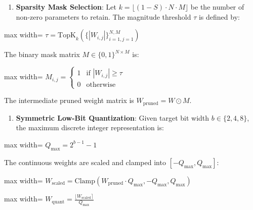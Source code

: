 \begin{enumerate}
\item \textbf{Sparsity Mask Selection}:
Let $k = \lfloor (1 - S) \cdot N \cdot M \rfloor$ be the number of non-zero parameters to retain. The magnitude threshold $\tau$ is defined by:
\end{enumerate}
\begin{center}
\begin{adjustbox}{max width=\columnwidth}
$\displaystyle
\tau = \text{TopK}_{k} \left( \{ |W_{i,j}| \}_{i=1, j=1}^{N, M} \right)
$
\end{adjustbox}
\end{center}
The binary mask matrix $M \in \{0, 1\}^{N \times M}$ is:
\begin{center}
\begin{adjustbox}{max width=\columnwidth}
$\displaystyle
M_{i,j} = \begin{cases} 1 & \text{if } |W_{i,j}| \ge \tau \\ 0 & \text{otherwise} \end{cases}
$
\end{adjustbox}
\end{center}
The intermediate pruned weight matrix is $W_{\text{pruned}} = W \odot M$.

\begin{enumerate}
\item \textbf{Symmetric Low-Bit Quantization}:
Given target bit width $b \in \{2, 4, 8\}$, the maximum discrete integer representation is:
\end{enumerate}
\begin{center}
\begin{adjustbox}{max width=\columnwidth}
$\displaystyle
Q_{\text{max}} = 2^{b - 1} - 1
$
\end{adjustbox}
\end{center}
The continuous weights are scaled and clamped into $[-Q_{\text{max}}, Q_{\text{max}}]$:
\begin{center}
\begin{adjustbox}{max width=\columnwidth}
$\displaystyle
W_{\text{scaled}} = \text{Clamp}\left( W_{\text{pruned}} \cdot Q_{\text{max}}, -Q_{\text{max}}, Q_{\text{max}} \right)
$
\end{adjustbox}
\end{center}
\begin{center}
\begin{adjustbox}{max width=\columnwidth}
$\displaystyle
W_{\text{quant}} = \frac{\lfloor W_{\text{scaled}} \rceil}{Q_{\text{max}}}
$
\end{adjustbox}
\end{center}


